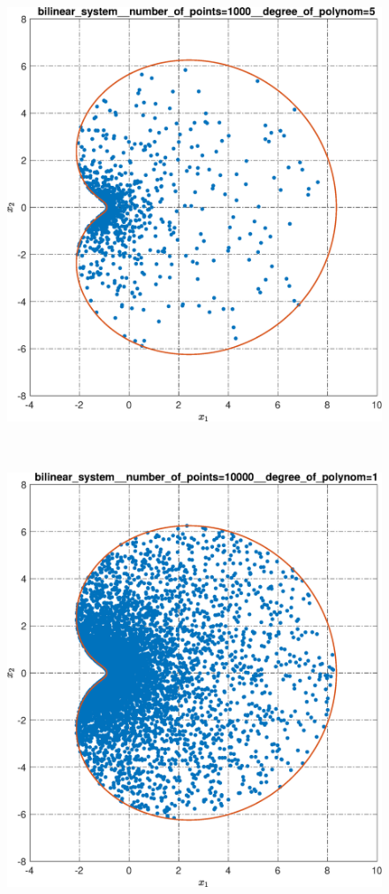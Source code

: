 \documentclass[../main.tex]{subfiles}
\begin{document}
   \begin{figure}[ht!] 
  	\hspace{-2.5ex}
  	\begin{minipage}[b]{.3\linewidth} 
  		\small
  		\centering 
  		\includegraphics[width=\linewidth]{images/bilinear_system__number_of_points=1000__degree_of_polynom=5.eps}
  	\end{minipage}
  	\hfill
  	\begin{minipage}[b]{.3\linewidth} 
  		\small
  		\centering
  		\includegraphics[width=\linewidth]{images/bilinear_system__number_of_points=10000__degree_of_polynom=1.eps}

\end{minipage}
\end{figure}
\end{document}
